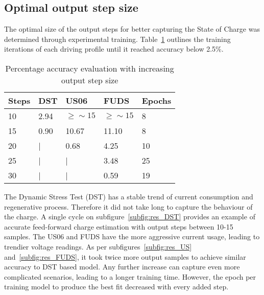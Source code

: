 \subsection{Optimal output step size}
    The optimal size of the output steps for better capturing the State of Charge was determined through experimental training. Table~\ref{tab:out_steps} outlines the training iterations of each driving profile until it reached accuracy below 2.5\%.
    \begin{table}[htbp]
        \centering
        \caption{Percentage accuracy evaluation with increasing output step size}
        \label{tab:out_steps}
        \begin{tabular}{ p{1.5cm} || p{1.5cm} p{1.5cm} p{1.5cm} || p{1.5cm}  }
            \hline
            Steps & DST & US06 & FUDS & Epochs \\
            \hline
            10 & 2.94 & $\geq\sim 15$ & $\geq\sim 15$ & 8 \\
            15 & 0.90 & 10.67  & 11.10  & 8 \\
            20 & |    & 0.68   &  4.25  & 10 \\
            25 & |    & |      &  3.48  & 25 \\
            30 & |    & |      &  0.59  & 19 \\
            \hline
        \end{tabular}
    \end{table}
    
    The Dynamic Stress Test (DST) has a stable trend of current consumption and regenerative process.
    Therefore it did not take long to capture the behaviour of the charge.
    A single cycle on subfigure~\ref{subfig:res_DST} provides an example of accurate feed-forward charge estimation with output steps between 10-15 samples.
    The US06 and FUDS have the more aggressive current usage, leading to trendier voltage readings.
    As per subfigures~\ref{subfig:res_US} and~\ref{subfig:res_FUDS}, it took twice more output samples to achieve similar accuracy to DST based model.
    Any further increase can capture even more complicated scenarios, leading to a longer training time.
    However, the epoch per training model to produce the best fit decreased with every added step.
    
